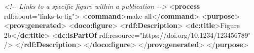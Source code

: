 \documentclass[manuscript]{acmart}
\newenvironment{Shaded}{}{}
\newcommand{\CommentTok}[1]{\textcolor[rgb]{0.38,0.63,0.69}{\textit{#1}}}
\newcommand{\KeywordTok}[1]{\textcolor[rgb]{0.00,0.44,0.13}{\textbf{#1}}}
\newcommand{\NormalTok}[1]{#1}
\newcommand{\OtherTok}[1]{\textcolor[rgb]{0.00,0.44,0.13}{#1}}
\newcommand{\StringTok}[1]{\textcolor[rgb]{0.25,0.44,0.63}{#1}}
\begin{document}
\begin{Shaded}
\begin{Highlighting}[]
  \CommentTok{\textless{}!{-}{-} Links to a specific figure within a publication {-}{-}\textgreater{}}
\NormalTok{  \textless{}}\KeywordTok{process}\OtherTok{ rdf:about=}\StringTok{"links{-}to{-}fig"}\NormalTok{\textgreater{}}
\NormalTok{    \textless{}}\KeywordTok{command}\NormalTok{\textgreater{}make all\textless{}/}\KeywordTok{command}\NormalTok{\textgreater{}}
\NormalTok{    \textless{}}\KeywordTok{purpose}\NormalTok{\textgreater{}}
\NormalTok{      \textless{}}\KeywordTok{prov:generated}\NormalTok{\textgreater{}}
\NormalTok{        \textless{}}\KeywordTok{doco:figure}\NormalTok{\textgreater{}}
\NormalTok{          \textless{}}\KeywordTok{rdf:Description}\NormalTok{\textgreater{}}
\NormalTok{            \textless{}}\KeywordTok{dc:title}\NormalTok{\textgreater{}Figure 2b\textless{}/}\KeywordTok{dc:title}\NormalTok{\textgreater{}}
\NormalTok{            \textless{}}\KeywordTok{dc:isPartOf}\OtherTok{ rdf:resource=}\StringTok{"https://doi.org/10.1234/123456789"}\NormalTok{ /\textgreater{}}
\NormalTok{          \textless{}/}\KeywordTok{rdf:Description}\NormalTok{\textgreater{}}
\NormalTok{        \textless{}/}\KeywordTok{doco:figure}\NormalTok{\textgreater{}}
\NormalTok{      \textless{}/}\KeywordTok{prov:generated}\NormalTok{\textgreater{}}
\NormalTok{    \textless{}/}\KeywordTok{purpose}\NormalTok{\textgreater{}}


\end{Highlighting}
\end{Shaded}
\end{document}
